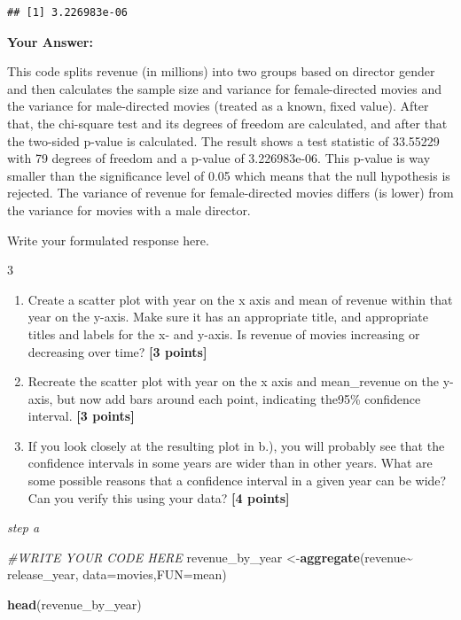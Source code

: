\documentclass[
]{article}
\newenvironment{Shaded}{\begin{snugshade}}{\end{snugshade}}
\newcommand{\AttributeTok}[1]{\textcolor[rgb]{0.13,0.29,0.53}{#1}}
\newcommand{\CommentTok}[1]{\textcolor[rgb]{0.56,0.35,0.01}{\textit{#1}}}
\newcommand{\FunctionTok}[1]{\textcolor[rgb]{0.13,0.29,0.53}{\textbf{#1}}}
\newcommand{\NormalTok}[1]{#1}
\newcommand{\OtherTok}[1]{\textcolor[rgb]{0.56,0.35,0.01}{#1}}
\newcommand{\SpecialCharTok}[1]{\textcolor[rgb]{0.81,0.36,0.00}{\textbf{#1}}}
\providecommand{\tightlist}{%
  \setlength{\itemsep}{0pt}\setlength{\parskip}{0pt}}
\begin{document}
\begin{verbatim}
## [1] 3.226983e-06
\end{verbatim}

\textbf{Your Answer:}

This code splits revenue (in millions) into two groups based on director
gender and then calculates the sample size and variance for
female-directed movies and the variance for male-directed movies
(treated as a known, fixed value). After that, the chi-square test and
its degrees of freedom are calculated, and after that the two-sided
p-value is calculated. The result shows a test statistic of 33.55229
with 79 degrees of freedom and a p-value of 3.226983e-06. This p-value
is way smaller than the significance level of 0.05 which means that the
null hypothesis is rejected. The variance of revenue for female-directed
movies differs (is lower) from the variance for movies with a male
director.

Write your formulated response here.

3

\begin{enumerate}
\def\labelenumi{\alph{enumi}.}
\tightlist
\item
  Create a scatter plot with year on the x axis and mean of revenue
  within that year on the y-axis. Make sure it has an appropriate title,
  and appropriate titles and labels for the x- and y-axis. Is revenue of
  movies increasing or decreasing over time? \textbf{[3 points]}
\item
  Recreate the scatter plot with year on the x axis and mean\_revenue on
  the y-axis, but now add bars around each point, indicating the95\%
  confidence interval. \textbf{[3 points]}
\item
  If you look closely at the resulting plot in b.), you will probably
  see that the confidence intervals in some years are wider than in
  other years. What are some possible reasons that a confidence interval
  in a given year can be wide? Can you verify this using your data?
  \textbf{[4 points]}
\end{enumerate}

\emph{step a}

\begin{Shaded}
\begin{Highlighting}[]
\CommentTok{\#WRITE YOUR CODE HERE}
\NormalTok{revenue\_by\_year }\OtherTok{\textless{}{-}}\FunctionTok{aggregate}\NormalTok{(revenue}\SpecialCharTok{\textasciitilde{}}\NormalTok{ release\_year, }\AttributeTok{data=}\NormalTok{movies,}\AttributeTok{FUN=}\NormalTok{mean)}

\FunctionTok{head}\NormalTok{(revenue\_by\_year)}
\end{Highlighting}
\end{Shaded}
\end{document}
